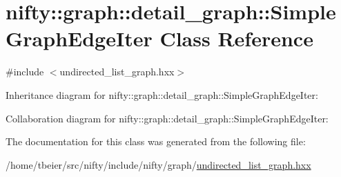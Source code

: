 \hypertarget{classnifty_1_1graph_1_1detail__graph_1_1SimpleGraphEdgeIter}{}\section{nifty\+:\+:graph\+:\+:detail\+\_\+graph\+:\+:Simple\+Graph\+Edge\+Iter Class Reference}
\label{classnifty_1_1graph_1_1detail__graph_1_1SimpleGraphEdgeIter}


{\ttfamily \#include $<$undirected\+\_\+list\+\_\+graph.\+hxx$>$}



Inheritance diagram for nifty\+:\+:graph\+:\+:detail\+\_\+graph\+:\+:Simple\+Graph\+Edge\+Iter\+:


Collaboration diagram for nifty\+:\+:graph\+:\+:detail\+\_\+graph\+:\+:Simple\+Graph\+Edge\+Iter\+:


The documentation for this class was generated from the following file\+:\begin{DoxyCompactItemize}
\item 
/home/tbeier/src/nifty/include/nifty/graph/\hyperlink{graph_2undirected__list__graph_8hxx}{undirected\+\_\+list\+\_\+graph.\+hxx}\end{DoxyCompactItemize}
